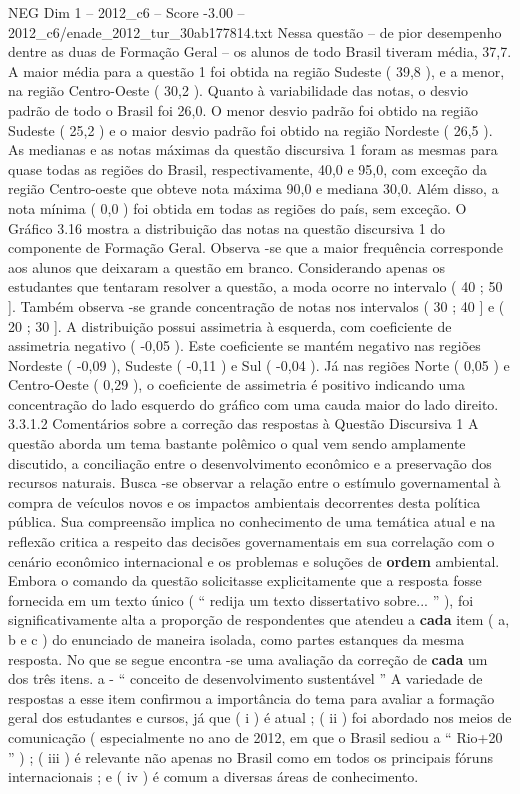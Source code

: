\begin{textsample}{NEG Dim 1 – 2012\_c6 – Score -3.00 – 2012\_c6/enade\_2012\_tur\_30ab177814.txt}
Nessa questão – de pior desempenho dentre as duas de Formação Geral – os alunos de todo Brasil tiveram média, 37,7.
A maior média para a questão 1 foi obtida na região Sudeste ( 39,8 ), e a menor, na região Centro-Oeste ( 30,2 ).
Quanto à variabilidade das notas, o desvio padrão de todo o Brasil foi 26,0.
O menor desvio padrão foi obtido na região Sudeste ( 25,2 ) e o maior desvio padrão foi obtido na região Nordeste ( 26,5 ).
As medianas e as notas máximas da questão discursiva 1 foram as mesmas para quase todas as regiões do Brasil, respectivamente, 40,0 e 95,0, com exceção da região Centro-oeste que obteve nota máxima 90,0 e mediana 30,0.
Além disso, a nota mínima ( 0,0 ) foi obtida em todas as regiões do país, sem exceção.
O Gráfico 3.16 mostra a distribuição das notas na questão discursiva 1 do componente de Formação Geral.
Observa -se que a maior frequência corresponde aos alunos que deixaram a questão em branco.
Considerando apenas os estudantes que tentaram resolver a questão, a moda ocorre no intervalo ( 40 ; 50 ].
Também observa -se grande concentração de notas nos intervalos ( 30 ; 40 ] e ( 20 ; 30 ].
A distribuição possui assimetria à esquerda, com coeficiente de assimetria negativo ( -0,05 ).
Este coeficiente se mantém negativo nas regiões Nordeste ( -0,09 ), Sudeste ( -0,11 ) e Sul ( -0,04 ).
Já nas regiões Norte ( 0,05 ) e Centro-Oeste ( 0,29 ), o coeficiente de assimetria é positivo indicando uma concentração do lado esquerdo do gráfico com uma cauda maior do lado direito. 3.3.1.2 Comentários sobre a correção das respostas à Questão Discursiva 1 A questão aborda um tema bastante polêmico o qual vem sendo amplamente discutido, a conciliação entre o desenvolvimento econômico e a preservação dos recursos naturais.
Busca -se observar a relação entre o estímulo governamental à compra de veículos novos e os impactos ambientais decorrentes desta política pública.
Sua compreensão implica no conhecimento de uma temática atual e na reflexão critica a respeito das decisões governamentais em sua correlação com o cenário econômico internacional e os problemas e soluções de \textbf{ordem} ambiental.
Embora o comando da questão solicitasse explicitamente que a resposta fosse fornecida em um texto único ( “ redija um texto dissertativo sobre... ” ), foi significativamente alta a proporção de respondentes que atendeu a \textbf{cada} item ( a, b e c ) do enunciado de maneira isolada, como partes estanques da mesma resposta.
No que se segue encontra -se uma avaliação da correção de \textbf{cada} um dos três itens. a - “ conceito de desenvolvimento sustentável ” A variedade de respostas a esse item confirmou a importância do tema para avaliar a formação geral dos estudantes e cursos, já que ( i ) é atual ; ( ii ) foi abordado nos meios de comunicação ( especialmente no ano de 2012, em que o Brasil sediou a “ Rio+20 ” ) ; ( iii ) é relevante não apenas no Brasil como em todos os principais fóruns internacionais ; e ( iv ) é comum a diversas áreas de conhecimento.

\end{textsample}
